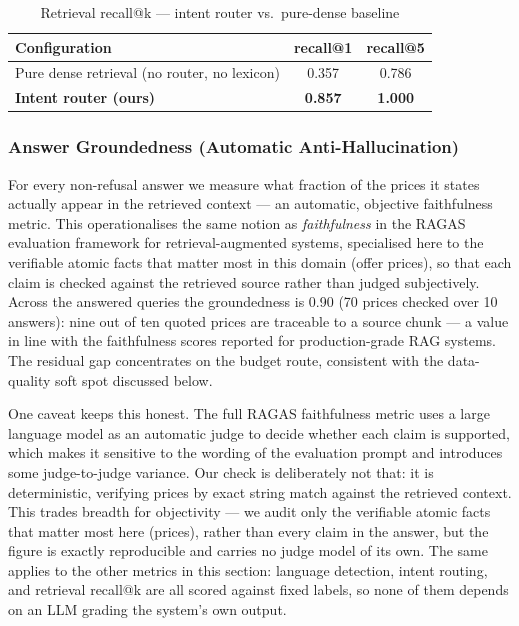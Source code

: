 \documentclass[12pt, a4paper]{report}
\newcommand{\humantext}[1]{#1}      %
\begin{document}
\begin{table}[H]
\centering
\caption{Retrieval recall@k --- intent router vs.\ pure-dense baseline}
\label{tab:metrics_retrieval}
\begin{tabularx}{\textwidth}{X c c}
\toprule
\textbf{Configuration} & \textbf{recall@1} & \textbf{recall@5} \\
\midrule
Pure dense retrieval (no router, no lexicon) & 0.357 & 0.786 \\
\textbf{Intent router (ours)}                & \textbf{0.857} & \textbf{1.000} \\
\bottomrule
\end{tabularx}
\end{table}

\subsubsection{Answer Groundedness (Automatic Anti-Hallucination)}
\humantext{For every non-refusal answer we measure what fraction of the prices it states actually appear in the retrieved context --- an automatic, objective faithfulness metric. This operationalises the same notion as \emph{faithfulness} in the RAGAS evaluation framework for retrieval-augmented systems, specialised here to the verifiable atomic facts that matter most in this domain (offer prices), so that each claim is checked against the retrieved source rather than judged subjectively. Across the answered queries the groundedness is 0.90 (70 prices checked over 10 answers): nine out of ten quoted prices are traceable to a source chunk --- a value in line with the faithfulness scores reported for production-grade RAG systems. The residual gap concentrates on the budget route, consistent with the data-quality soft spot discussed below.}

\humantext{One caveat keeps this honest. The full RAGAS faithfulness metric uses a large language model as an automatic judge to decide whether each claim is supported, which makes it sensitive to the wording of the evaluation prompt and introduces some judge-to-judge variance. Our check is deliberately not that: it is deterministic, verifying prices by exact string match against the retrieved context. This trades breadth for objectivity --- we audit only the verifiable atomic facts that matter most here (prices), rather than every claim in the answer, but the figure is exactly reproducible and carries no judge model of its own. The same applies to the other metrics in this section: language detection, intent routing, and retrieval recall@k are all scored against fixed labels, so none of them depends on an LLM grading the system's own output.}
\end{document}
